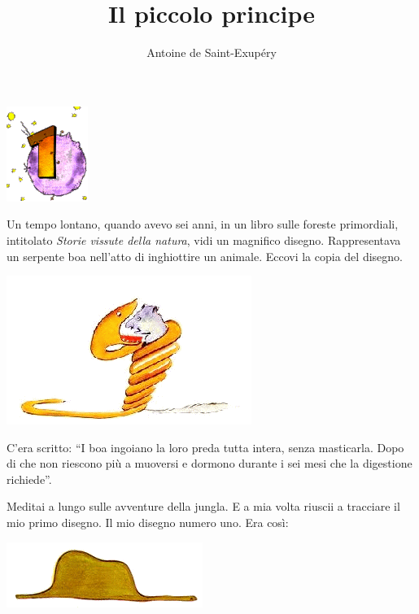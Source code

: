 \documentclass[11pt]{scrbook}
\title{Il piccolo principe}
\author{Antoine de Saint-Exupéry}
\date{}
\begin{document}
\maketitle

\chapter{}
\begin{center}
\includegraphics{img/chapter1}
\end{center}

Un tempo lontano, quando avevo sei anni, in un libro sulle foreste primordiali, intitolato \emph{Storie vissute della natura}, vidi un magnifico disegno. Rappresentava un serpente boa nell'atto di inghiottire un animale. Eccovi la copia del disegno.

\begin{center}
\includegraphics{img/1a}
\end{center}

C'era scritto: ``I boa ingoiano la loro preda tutta intera, senza masticarla. Dopo di che non riescono più a muoversi e dormono durante i sei mesi che la digestione richiede''.

Meditai a lungo sulle avventure della jungla. E a mia volta riuscii a tracciare il mio primo disegno. Il mio disegno numero uno. Era così:

\begin{center}
\includegraphics{img/sombrero}
\end{center}
\end{document}
